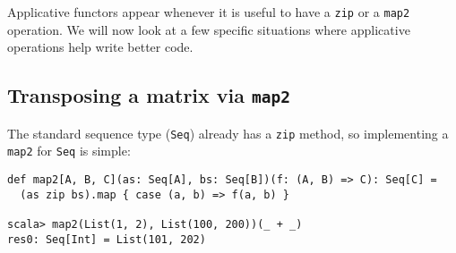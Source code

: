 Applicative functors appear whenever it is useful to have a \lstinline!zip!
or a \lstinline!map2! operation. We will now look at a few specific
situations where applicative operations help write better code.

\subsection{Transposing a matrix via \texttt{map2}}

The standard sequence type (\lstinline!Seq!) already has a \lstinline!zip!
method, so implementing a \lstinline!map2! for \lstinline!Seq! is
simple:
\begin{lstlisting}
def map2[A, B, C](as: Seq[A], bs: Seq[B])(f: (A, B) => C): Seq[C] =
  (as zip bs).map { case (a, b) => f(a, b) }

scala> map2(List(1, 2), List(100, 200))(_ + _)
res0: Seq[Int] = List(101, 202)
\end{lstlisting}

